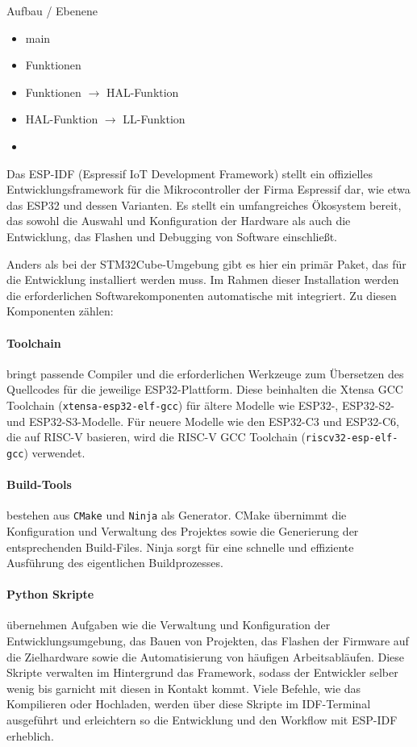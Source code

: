 Aufbau / Ebenene
\begin{itemize}
	\item main
	\item Funktionen
	\item Funktionen $\rightarrow$ HAL-Funktion
	\item HAL-Funktion $\rightarrow$ LL-Funktion
	\item 
\end{itemize}


Das ESP-IDF (Espressif IoT Development Framework) stellt ein offizielles Entwicklungsframework für die Mikrocontroller der Firma Espressif dar, wie etwa das ESP32 und dessen Varianten. 
Es stellt ein umfangreiches Ökosystem bereit, das sowohl die Auswahl und Konfiguration der Hardware als auch die Entwicklung, das Flashen und Debugging von Software einschließt.

Anders als bei der STM32Cube-Umgebung gibt es hier ein primär Paket, das für die Entwicklung installiert werden muss.
Im Rahmen dieser Installation werden die erforderlichen Softwarekomponenten automatische mit integriert.
Zu diesen Komponenten zählen:

\paragraph{Toolchain}
bringt passende Compiler und die erforderlichen Werkzeuge zum Übersetzen des Quellcodes für die jeweilige ESP32-Plattform. 
Diese beinhalten die Xtensa GCC Toolchain (\texttt{xtensa-esp32-elf-gcc}) für ältere Modelle wie  ESP32-, ESP32-S2- und ESP32-S3-Modelle.
Für neuere Modelle wie den ESP32-C3 und ESP32-C6, die auf RISC-V basieren, wird die RISC-V GCC Toolchain (\texttt{riscv32-esp-elf-gcc}) verwendet.

\paragraph{Build-Tools} 
bestehen aus \texttt{CMake} und \texttt{Ninja} als Generator. 
CMake übernimmt die Konfiguration und Verwaltung des Projektes sowie die Generierung der entsprechenden Build-Files. 
Ninja sorgt für eine schnelle und effiziente Ausführung des eigentlichen Buildprozesses.

\paragraph{Python Skripte}
übernehmen Aufgaben wie die Verwaltung und Konfiguration der Entwicklungsumgebung, das Bauen von Projekten, das Flashen der Firmware auf die Zielhardware sowie die Automatisierung von häufigen Arbeitsabläufen. 
Diese Skripte verwalten im Hintergrund das Framework, sodass der Entwickler selber wenig bis garnicht mit diesen in Kontakt kommt.
Viele Befehle, wie das Kompilieren oder Hochladen, werden über diese Skripte im IDF-Terminal ausgeführt und erleichtern so die Entwicklung und den Workflow mit ESP-IDF erheblich.

